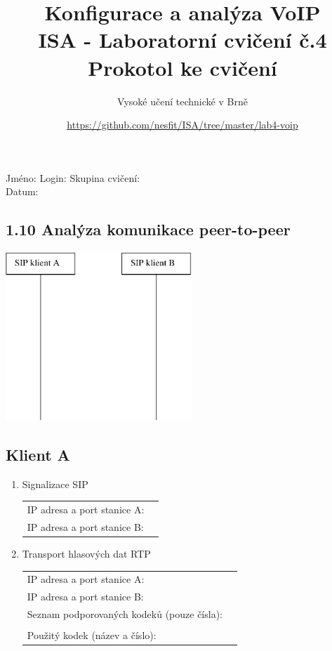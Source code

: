 \documentclass[a4paper,11pt]{article}
\title{Konfigurace a analýza VoIP\\
{\bf\large ISA - Laboratorní cvičení č.4}\\
{\bf\large Prokotol ke cvičení}}
\author{Vysoké učení technické v Brně}
\date{\url{https://github.com/nesfit/ISA/tree/master/lab4-voip}}
\begin{document}
{\let\newpage\relax\maketitle}
\vspace{-3mm}
Jméno: \hspace{4cm} Login: \hspace{4cm} Skupina cvičení:\\
Datum:

\vspace{-2mm}
\subsection*{1.10 Analýza komunikace peer-to-peer}
\begin{multicols}{2}
  \begin{center}
    \includegraphics[width=70mm]{img/peer-to-peer.eps}
  \end{center}
  \columnbreak
  \subsection*{Klient A}      
  \begin{enumerate}
    \item Signalizace SIP
    
    \begin{tabular}{lp{2cm}}
      IP adresa a port stanice A: &\\
      IP adresa a port stanice B: &\\
    \end{tabular}               
   
    \item Transport hlasových dat RTP
    
    \begin{tabular}{lp{2cm}}
      IP adresa a port stanice A: &\\
      IP adresa a port stanice B: &\\
      Seznam podporovaných kodeků (pouze čísla):&\\
      &\\
      Použitý kodek (název a číslo): &\\
    \end{tabular}               
  \end{enumerate}      
\end{multicols}
\end{document}

